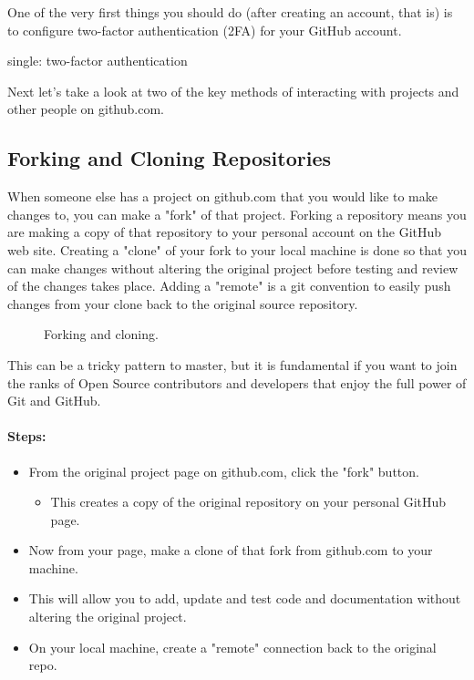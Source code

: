 \justify
One of the very first things you should do (after creating an account,
that is) is to configure two-factor authentication (2FA) for your
GitHub account.

single: two-factor authentication

\justify
Next let's take a look at two of the key methods of interacting with
projects and other people on github.com.

\subsection{Forking and Cloning Repositories}
\justify
When someone else has a project on github.com that you would like to make changes to, you can make a "fork" of that project. Forking a repository means you are making a copy of that repository to your personal account on the GitHub web site.
\justify
Creating a "clone" of your fork to your local machine is done so that
you can make changes without altering the original project before testing and review of the changes takes place.
\justify
Adding a "remote" is a git convention to easily push changes from your clone back to the original source repository.

\begin{figure}[!htb]
      
      \caption{Forking and cloning.}
\end{figure}

\justify
This can be a tricky pattern to master, but it is fundamental if you
want to join the ranks of Open Source contributors and developers that
enjoy the full power of Git and GitHub.

\paragraph{Steps:}

\begin{itemize}
      \item
            From the original project page on github.com, click the "fork" button.
            \begin{itemize}
                  \item
                        This creates a copy of the original repository on your personal
                        GitHub page.
            \end{itemize}
      \item
            Now from your page, make a clone of that fork from github.com to your
            machine.
      \item
            This will allow you to add, update and test code and documentation without altering the original project.
      \item
            On your local machine, create a "remote" connection back to the
            original repo.
\end{itemize}

